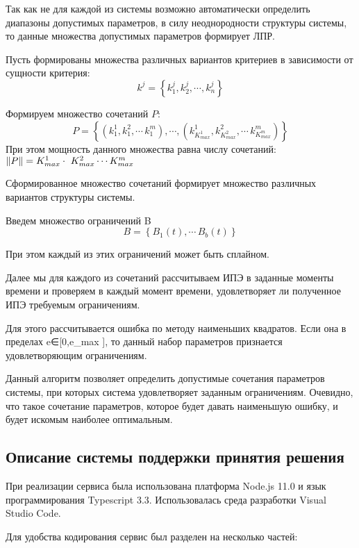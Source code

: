 Так как не для каждой из системы возможно автоматически определить диапазоны допустимых параметров, 
в силу неоднородности структуры системы, то данные множества допустимых параметров формирует ЛПР.

Пусть формированы множества различных вариантов критериев в зависимости от сущности критерия:
\begin{equation}
    k^j=\left\{ k_1^j,k_2^j, \cdots ,k_n^j \right\}
\end{equation}

Формируем множество сочетаний $P$: 
\begin{equation}
    P=\left\{ (k^1_1, k^2_1, \cdots\, k^m_1), \cdots , (k^1_{K^1_{max}}, k^2_{K^2_{max}}, \cdots\, k^m_{K^m_{max}}) \right\}
\end{equation}
При этом мощность данного множества равна числу сочетаний: $ \norm{P} = K^1_{max} \cdot \ K^2_{max} \cdots  K^m_{max} $

Сформированное множество сочетаний формирует множество различных вариантов структуры системы.

Введем множество ограничений B
\begin{equation}
    B= \left\{ B_1(t),\cdots\, B_b(t) \right\} 
\end{equation}

При этом каждый из этих ограничений может быть сплайном.

Далее мы для каждого из сочетаний рассчитываем ИПЭ в заданные моменты времени и проверяем в каждый момент времени, удовлетворяет ли полученное ИПЭ требуемым ограничениям.

Для этого рассчитывается ошибка по методу наименьших квадратов. 
Если она в пределах e∈[0,e_max ], то данный набор параметров признается удовлетворяющим ограничениям.

Данный алгоритм позволяет определить допустимые сочетания параметров системы, при которых система удовлетворяет заданным ограничениям. 
Очевидно, что такое сочетание параметров, которое будет давать наименьшую ошибку, и будет искомым наиболее оптимальным.

\subsection{Описание системы поддержки принятия решения}
При реализации сервиса была использована платформа Node.js 11.0 и язык программирования Typescript 3.3. 
Использовалась среда разработки Visual Studio Code.

Для удобства кодирования сервис был разделен на несколько частей:

